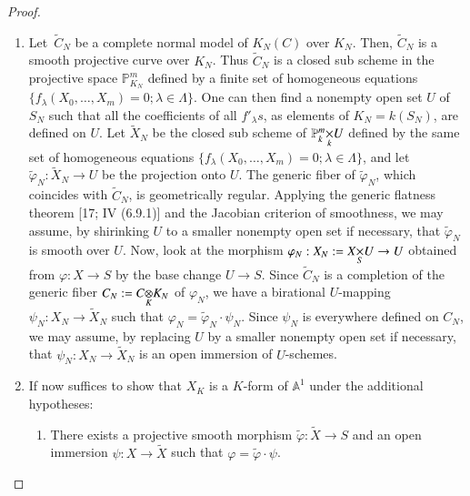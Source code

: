 \begin{proof}
\begin{enumerate}
\item Let\pageoriginale\ $\widetilde{C}_{N}$ be a complete normal model
  of $K_{N}(C)$ over $K_{N}$. Then, $\widetilde{C}_{N}$ is a smooth
  projective curve over $K_{N}$. Thus $\widetilde{C}_{N}$ is a closed
  sub scheme in the projective space $\mathbb{P}^{m}_{K_{N}}$ defined
  by a finite set of homogeneous equations
  $\{f_{\lambda}(X_{0},\ldots,X_{m})=0;\lambda\in\Lambda\}$. One can
  then find a nonempty open set $U$ of $S_{N}$ such that all the
  coefficients of all $f'_{\lambda}s$, as elements of
  $K_{N}=k(S_{N})$, are defined on $U$. Let $\widetilde{X}_{N}$ be the
  closed sub scheme of $\fprod{\mathbb{P}^{m}_{k}}{U}{k}$ defined by
  the same set of homogeneous equations
  $\{f_{\lambda}(X_{0},\ldots,X_{m})=0;\lambda\in \Lambda\}$, and let
  $\widetilde{\varphi}_{N}:\widetilde{X}_{N}\to U$ be the projection
  onto $U$. The generic fiber of $\widetilde{\varphi}_{N}$, which
  coincides with $\widetilde{C}_{N}$, is geometrically
  regular. Applying the generic flatness theorem [17; IV (6.9.1)] and
  the Jacobian criterion of smoothness, we may assume, by shirinking
  $U$ to a smaller nonempty open set if necessary, that
  $\widetilde{\varphi}_{N}$ is smooth over $U$. Now, look at the
  morphism $\varphi_{N}:X_{N}:=\fprod{X}{U}{S}\to U$ obtained from
  $\varphi:X\to S$ by the base change $U\to S$. Since
  $\widetilde{C}_{N}$ is a completion of the generic fiber
  $C_{N}:=\foprod{C}{K_{N}}{K}$ of $\varphi_{N}$, we have a birational
  $U$-mapping $\psi_{N}:X_{N}\to \widetilde{X}_{N}$ such that
  $\varphi_{N}=\widetilde{\varphi}_{N}\cdot\psi_{N}$. Since $\psi_{N}$
  is everywhere defined on $C_{N}$, we may assume, by replacing $U$ by
  a smaller nonempty open set if necessary, that $\psi_{N}:X_{N}\to
  \widetilde{X}_{N}$ is an open immersion of $U$-schemes.

\item If now suffices to show that $X_{K}$ is a $K$-form of
  $\mathbb{A}^{1}$ under the additional hypotheses:
\begin{enumerate}
\renewcommand{\theenumii}{\roman{enumii}}
\renewcommand{\labelenumii}{(\theenumii)}
\item There exists a projective smooth morphism
  $\widetilde{\varphi}:\widetilde{X}\to S$ and an open immersion
  $\psi:X\to \widetilde{X}$ such that
  $\varphi=\widetilde{\varphi}\cdot\psi$. 


\end{enumerate}
\end{enumerate}
\end{proof}
